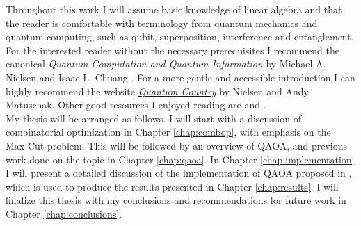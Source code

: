 Throughout this work I will assume basic knowledge of linear algebra and that the reader is comfortable with terminology from quantum mechanics and quantum computing, such as qubit, superposition, interference and entanglement. For the interested reader without the necessary prerequisites I recommend the canonical \emph{Quantum Computation and Quantum Information} by Michael A. Nielsen and Isaac L. Chuang \cite{Mike&Ike}. For a more gentle and accessible introduction I can highly recommend the website \href{https://quantum.country/qcvc}{\emph{Quantum Country}} \cite{QuantumCountry} by Nielsen and Andy Matuschak. Other good resources I enjoyed reading are \cite{Hidary} and \cite{Qiskit-Textbook}.
\\

My thesis will be arranged as follows. I will start with a discussion of combinatorial optimization in Chapter \ref{chap:combop}, with emphasis on the Max-Cut problem. This will be followed by an overview of QAOA, and previous work done on the topic in Chapter \ref{chap:qaoa}. In Chapter \ref{chap:implementation} I will present a detailed discussion of the implementation of QAOA proposed in \cite{ZWCPL18}, which is used to produce the results presented in Chapter \ref{chap:results}. I will finalize this thesis with my conclusions and recommendations for future work in Chapter \ref{chap:conclusions}. 
